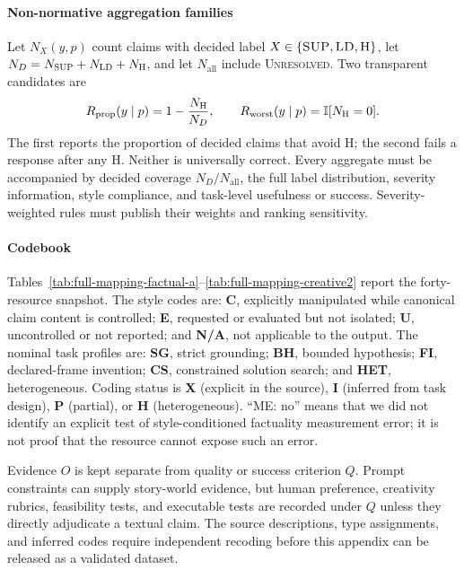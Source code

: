 \documentclass{clv2025}
\newcommand{\LD}{\textsc{LD}}
\newcommand{\Hall}{\textsc{H}}
\newcommand{\SUP}{\textsc{SUP}}
\newcommand{\UNR}{\textsc{Unresolved}}
\begin{document}
\paragraph{Non-normative aggregation families}
Let $N_X(y,p)$ count claims with decided label
$X\in\{\SUP,\LD,\Hall\}$, let
$N_D=N_{\SUP}+N_{\LD}+N_{\Hall}$, and let $N_{\mathrm{all}}$ include
\UNR.
Two transparent candidates are
\begin{equation}
R_{\mathrm{prop}}(y\mid p)=1-\frac{N_{\Hall}}{N_D},
\qquad
R_{\mathrm{worst}}(y\mid p)=\mathbb{I}[N_{\Hall}=0].
\label{eq:aggregation}
\end{equation}
The first reports the proportion of decided claims that avoid \Hall; the
second fails a response after any \Hall.
Neither is universally correct.
Every aggregate must be accompanied by decided coverage
$N_D/N_{\mathrm{all}}$, the full label distribution, severity information,
style compliance, and task-level usefulness or success.
Severity-weighted rules must publish their weights and ranking
sensitivity.

%
\makeatletter\def\@currentlabel{B}\makeatother\label{app:mapping}
\renewcommand*{\theHtable}{B.\arabic{table}}

\paragraph{Codebook}
Tables~\ref{tab:full-mapping-factual-a}--\ref{tab:full-mapping-creative2}
report the forty-resource snapshot.
The style codes are: \textbf{C}, explicitly manipulated while canonical
claim content is controlled; \textbf{E}, requested or evaluated but not
isolated; \textbf{U}, uncontrolled or not reported; and \textbf{N/A}, not
applicable to the output.
The nominal task profiles are: \textbf{SG}, strict grounding;
\textbf{BH}, bounded hypothesis; \textbf{FI}, declared-frame invention;
\textbf{CS}, constrained solution search; and \textbf{HET},
heterogeneous.
Coding status is \textbf{X} (explicit in the source), \textbf{I}
(inferred from task design), \textbf{P} (partial), or \textbf{H}
(heterogeneous).
``ME: no'' means that we did not identify an explicit test of
style-conditioned factuality measurement error; it is not proof that the
resource cannot expose such an error.

Evidence $O$ is kept separate from quality or success criterion $Q$.
Prompt constraints can supply story-world evidence, but human preference,
creativity rubrics, feasibility tests, and executable tests are recorded
under $Q$ unless they directly adjudicate a textual claim.
The source descriptions, type assignments, and inferred codes require
independent recoding before this appendix can be released as a validated
dataset.
\end{document}
